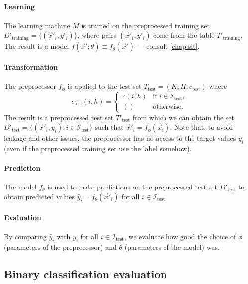 \paragraph{Learning}

The learning machine $M$ is trained on the preprocessed training set $D'_\text{training} =
\{(\vec{x}'_i, y'_i)\}$, where pairs $(\vec{x}'_i, y'_i)$ come from the table
$T'_\text{training}$.  The result is a model $f(\vec{x}'; \theta) \equiv
f_\theta(\vec{x}')$ --- consult \cref{chap:slt}.

\paragraph{Transformation}

The preprocessor $f_\phi$ is applied to the test set $T_\text{test} = (K, H,
c_\text{test})$ where \[
  c_\text{test}(i, h) = \begin{cases}
    c(i, h) & \text{if } i \in \mathcal{I}_\text{test}\text{,} \\
    () & \text{otherwise}\text{.}
  \end{cases}
\]  The result is a preprocessed test set $T'_\text{test}$ from which we can obtain the
    set $D'_\text{test} = \{(\vec{x}'_i, y_i) : i \in \mathcal{I}_\text{test}\}$ such
    that $\vec{x}'_i = f_\phi(\vec{x}_i)$.  Note that, to avoid \gls{leakage} and other
    issues, the preprocessor has no access to the target values $y_i$ (even if the
    preprocessed training set use the label somehow).

\paragraph{Prediction}

The model $f_\theta$ is used to make predictions on the preprocessed test set
    $D'_\text{test}$ to obtain predicted values $\hat{y}_i = f_\theta(\vec{x}'_i)$ for all
    $i \in \mathcal{I}_\text{test}$.

\paragraph{Evaluation}

By comparing $\hat{y}_i$ with $y_i$ for all $i \in \mathcal{I}_\text{test}$, we
evaluate how good the choice of $\phi$ (parameters of the preprocessor) and $\theta$
(parameters of the model) was.

\subsection{Binary classification evaluation}

